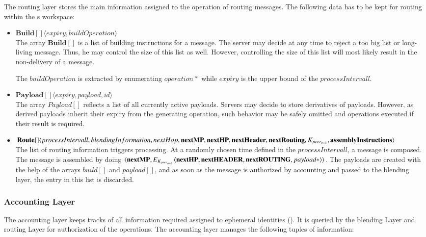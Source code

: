 The routing layer stores the main information assigned to the operation of routing messages. The following data has to be kept for routing within the s workspace:
\begin{itemize}
	\item $\mathbf{Build[]}\langle expiry, buildOperation \rangle$\\
	The array $\mathbf{Build[]}$ is a list of building instructions for a message. The server may decide at any time to reject a too big list or long-living message. Thus, he may control the size of this list as well. However, controlling the size of this list will most likely result in the non-delivery of a message. 
	
	The $buildOperation$ is extracted by enumerating $operation*$ while $expiry$ is the upper bound of the $processIntervall$.
	\item $\mathbf{Payload[]}\langle expiry, payload, id \rangle$\\
	The array $Payload[]$ reflects a list of all currently active payloads. Servers may decide to store derivatives of payloads. However, as derived payloads inherit their expiry from the generating operation, such behavior may be safely omitted and operations executed if their result is required.
	
	\item $\splitatcommas{\mathbf{Route[]}\langle processIntervall, blendingInformation, nextHop, \mathbf{nextMP}, \mathbf {nextHP}, \mathbf{nextHeader}, \mathbf{nextRouting}, K_{peer_{o+1}}, \mathbf{assemblyInstructions} \rangle}$\\
	The list of routing information triggers processing. At a randomly chosen time defined in the $processIntervall$, a message is composed. The message is assembled by doing $\splitatcommas{\langle \mathbf{nextMP}, E_{K_{peer_{o+1}}}\langle \mathbf{nextHP}, \mathbf{nextHEADER}, \mathbf{nextROUTING}, payload* \rangle \rangle}$. The payloads are created with the help of the arrays $build[]$ and $payload[]$, and as soon as the message is authorized by accounting and passed to the blending layer, the entry in this list is discarded.
\end{itemize}

\subsubsection{Accounting Layer\label{sec:accountingLayer}}
The accounting layer keeps tracks of all information required assigned to ephemeral identities (). It is queried by the blending Layer and routing Layer for authorization of the operations. The accounting layer manages the following tuples of information:

